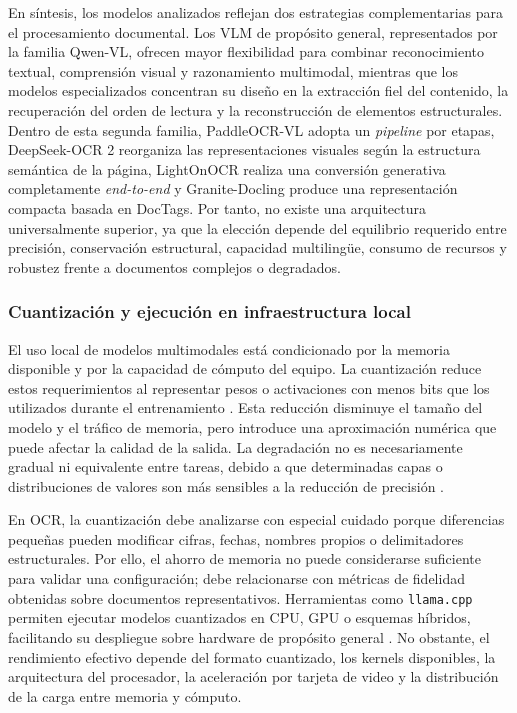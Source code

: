 En síntesis, los modelos analizados reflejan dos estrategias complementarias para el procesamiento documental. Los VLM de propósito general, representados por la familia Qwen-VL, ofrecen mayor flexibilidad para combinar reconocimiento textual, comprensión visual y razonamiento multimodal, mientras que los modelos especializados concentran su diseño en la extracción fiel del contenido, la recuperación del orden de lectura y la reconstrucción de elementos estructurales. Dentro de esta segunda familia, PaddleOCR-VL adopta un \textit{pipeline} por etapas, DeepSeek-OCR 2 reorganiza las representaciones visuales según la estructura semántica de la página, LightOnOCR realiza una conversión generativa completamente \textit{end-to-end} y Granite-Docling produce una representación compacta basada en DocTags. Por tanto, no existe una arquitectura universalmente superior, ya que la elección depende del equilibrio requerido entre precisión, conservación estructural, capacidad multilingüe, consumo de recursos y robustez frente a documentos complejos o degradados.


\subsubsection{Cuantización y ejecución en infraestructura local}

El uso local de modelos multimodales está condicionado por la memoria disponible y por la capacidad de cómputo del equipo. La cuantización reduce estos requerimientos al representar pesos o activaciones con menos bits que los utilizados durante el entrenamiento \cite{gholami2021quantization}. Esta reducción disminuye el tamaño del modelo y el tráfico de memoria, pero introduce una aproximación numérica que puede afectar la calidad de la salida. La degradación no es necesariamente gradual ni equivalente entre tareas, debido a que determinadas capas o distribuciones de valores son más sensibles a la reducción de precisión \cite{jin2024quantization}.

En OCR, la cuantización debe analizarse con especial cuidado porque diferencias pequeñas pueden modificar cifras, fechas, nombres propios o delimitadores estructurales. Por ello, el ahorro de memoria no puede considerarse suficiente para validar una configuración; debe relacionarse con métricas de fidelidad obtenidas sobre documentos representativos. Herramientas como \texttt{llama.cpp} permiten ejecutar modelos cuantizados en CPU, GPU o esquemas híbridos, facilitando su despliegue sobre hardware de propósito general \cite{sparrenberg2025llamacpp}. No obstante, el rendimiento efectivo depende del formato cuantizado, los kernels disponibles, la arquitectura del procesador, la aceleración por tarjeta de video y la distribución de la carga entre memoria y cómputo.


